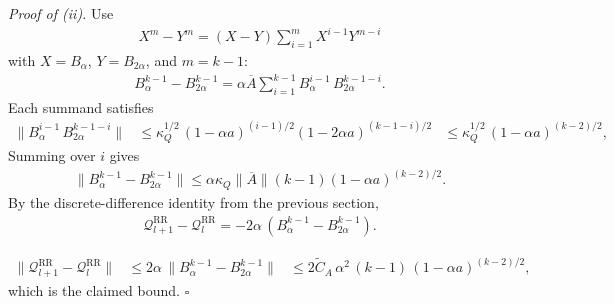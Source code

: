 \textit{Proof of (ii).} Use
\begin{equation}
\begin{aligned}
X^m - Y^m = (X - Y) \sum_{i = 1}^m X^{i - 1} Y^{m - i}
\end{aligned}
\end{equation}
with \(X = B_\alpha\), \(Y = B_{2 \alpha}\), and \(m = k - 1\):
\begin{equation}
\begin{aligned}
B_\alpha^{k - 1} - B_{2 \alpha}^{k - 1}
  = \alpha \overline{A} \sum_{i = 1}^{k - 1}
    B_\alpha^{i - 1} \, B_{2 \alpha}^{k - 1 - i}.
\end{aligned}
\end{equation}
Each summand satisfies
\begin{equation}
\begin{aligned}
\lVert  B_\alpha^{i - 1} \, B_{2 \alpha}^{k - 1 - i}  \rVert
  &\le \kappa_Q^{1 / 2} \, (1 - \alpha a)^{(i - 1) / 2} (1 - 2 \alpha a)^{(k - 1 - i) / 2} 
  &\le \kappa_Q^{1 / 2} \, (1 - \alpha a)^{(k - 2) / 2},
\end{aligned}
\end{equation}
Summing over \(i\) gives
\begin{equation}
\begin{aligned}
\lVert  B_\alpha^{k - 1} - B_{2 \alpha}^{k - 1}  \rVert
  \le \alpha \kappa_Q \lVert  \overline{A}  \rVert (k - 1) (1 - \alpha a)^{(k - 2) / 2}.
\end{aligned}
\end{equation}
By the discrete-difference identity from the previous section,
\begin{equation}
\begin{aligned}
\mathcal{Q}_{l + 1}^{\text{RR}} - \mathcal{Q}_l^{\text{RR}}
  = - 2 \alpha \, (B_\alpha^{k - 1} - B_{2 \alpha}^{k - 1}).
\end{aligned}
\end{equation}

\begin{equation}
\begin{aligned}
\lVert  \mathcal{Q}_{l + 1}^{\text{RR}} - \mathcal{Q}_l^{\text{RR}}  \rVert
  &\le 2 \alpha \, \lVert  B_\alpha^{k - 1} - B_{2 \alpha}^{k - 1}  \rVert 
  &\le 2 \widetilde{C}_A \, \alpha^2 \, (k - 1)
      \, (1 - \alpha a)^{(k - 2) / 2},
\end{aligned}
\end{equation}
which is the claimed bound. \(\square\)
